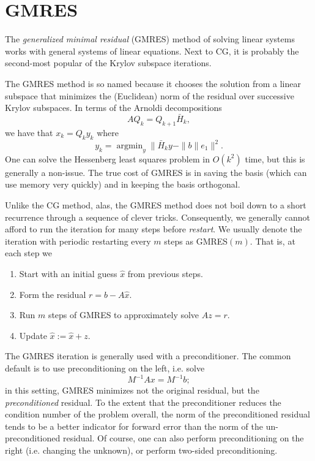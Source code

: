 \documentclass[12pt, leqno]{article} %
\begin{document}
\section{GMRES}

The {\em generalized minimal residual} (GMRES) method of solving
linear systems works with general systems of linear equations.
Next to CG, it is probably the second-most popular of the Krylov
subspace iterations.

The GMRES method is so named because it chooses the solution from a
linear subspace that minimizes the (Euclidean) norm of the residual
over successive Krylov subspaces.  In terms of the Arnoldi
decompositions
\[
  AQ_k = Q_{k+1} \bar{H}_k,
\]
we have that $x_k = Q_k y_k$ where
\[
  y_k = \operatorname{argmin}_y \|\bar{H}_k y - \|b\| e_1\|^2.
\]
One can solve the Hessenberg least squares problem in $O(k^2)$
time, but this is generally a non-issue.  The true cost of GMRES
is in saving the basis (which can use memory very quickly) and in
keeping the basis orthogonal.

Unlike the CG method, alas, the GMRES method does not boil down to a
short recurrence through a sequence of clever tricks.  Consequently,
we generally cannot afford to run the iteration for many steps before
{\em restart}.  We usually denote the iteration with periodic
restarting every $m$ steps as GMRES$(m)$.  That is, at each step we
\begin{enumerate}
  \item Start with an initial guess $\hat{x}$ from previous steps.
  \item Form the residual $r = b-A\hat{x}$.
  \item Run $m$ steps of GMRES to approximately solve $Az = r$.
  \item Update $\hat{x} := \hat{x} + z$.
\end{enumerate}

The GMRES iteration is generally used with a preconditioner.
The common default is to use preconditioning on the left, i.e.
solve
\[
  M^{-1} A x = M^{-1} b;
\]
in this setting, GMRES minimizes not the original residual,
but the {\em preconditioned} residual.  To the extent that the
preconditioner reduces the condition number of the problem overall,
the norm of the preconditioned residual tends to be a better indicator
for forward error than the norm of the un-preconditioned residual.
Of course, one can also perform preconditioning on the right (i.e. changing
the unknown), or perform two-sided preconditioning.
\end{document}
